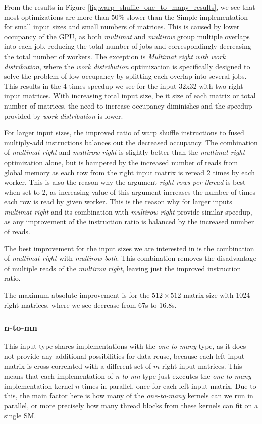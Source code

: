 From the results in Figure \ref{fig:warp_shuffle_one_to_many_results}, we see that most optimizations are more than 50\% slower than the Simple implementation for small input sizes and small numbers of matrices. This is caused by lower occupancy of the GPU, as both \textit{multimat} and \textit{multirow} group multiple overlaps into each job, reducing the total number of jobs and correspondingly decreasing the total number of workers. The exception is \textit{Multimat right with work distribution}, where the \textit{work distribution} optimization is specifically designed to solve the problem of low occupancy by splitting each overlap into several jobs. This results in the 4 times speedup we see for the input 32x32 with two right input matrices. With increasing total input size, be it size of each matrix or total number of matrices, the need to increase occupancy diminishes and the speedup provided by \textit{work distribution} is lower.

For larger input sizes, the improved ratio of warp shuffle instructions to fused multiply-add instructions balances out the decreased occupancy. The combination of \textit{multimat right} and \textit{multirow right} is slightly better than the \textit{multimat right} optimization alone, but is hampered by the increased number of reads from global memory as each row from the right input matrix is reread 2 times by each worker. This is also the reason why the argument \textit{right rows per thread} is best when set to 2, as increasing value of this argument increases the number of times each row is read by given worker. This is the reason why for larger inputs \textit{multimat right} and its combination with \textit{multirow right} provide similar speedup, as any improvement of the instruction ratio is balanced by the increased number of reads.

The best improvement for the input sizes we are interested in is the combination of \textit{multimat right} with \textit{multirow both}. This combination removes the disadvantage of multiple reads of the \textit{multirow right}, leaving just the improved instruction ratio.

The maximum absolute improvement is for the $512 \times 512$ matrix size with 1024 right matrices, where we see decrease from $67$s to $16.8$s.

\subsubsection{n-to-mn}
This input type shares implementations with the \textit{one-to-many} type, as it does not provide any additional possibilities for data reuse, because each left input matrix is cross-correlated with a different set of $m$ right input matrices. This means that each implementation of \textit{n-to-mn} type just executes the \textit{one-to-many} implementation kernel $n$ times in parallel, once for each left input matrix. Due to this, the main factor here is how many of the \textit{one-to-many} kernels can we run in parallel, or more precisely how many thread blocks from these kernels can fit on a single SM.

